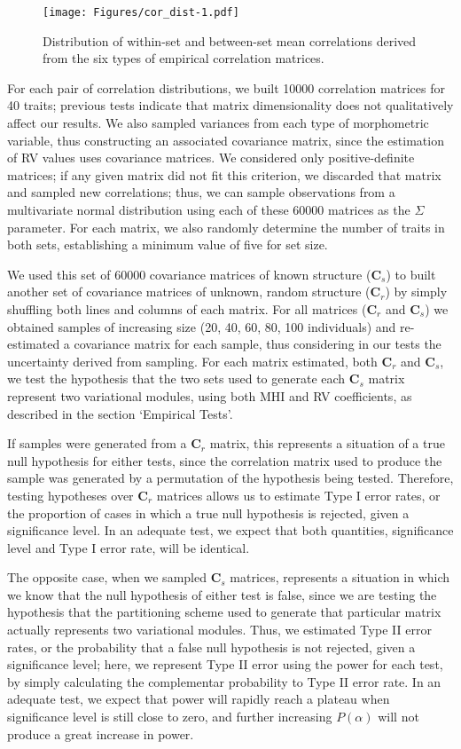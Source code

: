 \documentclass[12pt,twoside]{report}
\begin{document}
\begin{figure}[htbp]
\centering
\texttt{[image: Figures/cor\_dist-1.pdf]}
\caption{Distribution of within-set and between-set mean correlations
derived from the six types of empirical correlation matrices.
\label{fig:cor_dist}}
\end{figure}

For each pair of correlation distributions, we built 10000 correlation
matrices for 40 traits; previous tests indicate that matrix
dimensionality does not qualitatively affect our results. We also
sampled variances from each type of morphometric variable, thus
constructing an associated covariance matrix, since the estimation of RV
values uses covariance matrices. We considered only positive-definite
matrices; if any given matrix did not fit this criterion, we discarded
that matrix and sampled new correlations; thus, we can sample
observations from a multivariate normal distribution using each of these
60000 matrices as the $\Sigma$ parameter. For each matrix, we also
randomly determine the number of traits in both sets, establishing a
minimum value of five for set size.

We used this set of 60000 covariance matrices of known structure
($\mathbf{C}_s$) to built another set of covariance matrices of unknown,
random structure ($\mathbf{C}_r$) by simply shuffling both lines and
columns of each matrix. For all matrices ($\mathbf{C}_r$ and
$\mathbf{C}_s$) we obtained samples of increasing size (20, 40, 60, 80,
100 individuals) and re-estimated a covariance matrix for each sample,
thus considering in our tests the uncertainty derived from sampling. For
each matrix estimated, both $\mathbf{C}_r$ and $\mathbf{C}_s$, we test
the hypothesis that the two sets used to generate each $\mathbf{C}_s$
matrix represent two variational modules, using both MHI and RV
coefficients, as described in the section `Empirical Tests'.

If samples were generated from a $\mathbf{C}_r$ matrix, this represents
a situation of a true null hypothesis for either tests, since the
correlation matrix used to produce the sample was generated by a
permutation of the hypothesis being tested. Therefore, testing
hypotheses over $\mathbf{C}_r$ matrices allows us to estimate Type I
error rates, or the proportion of cases in which a true null hypothesis
is rejected, given a significance level. In an adequate test, we expect
that both quantities, significance level and Type I error rate, will be
identical.

The opposite case, when we sampled $\mathbf{C}_s$ matrices, represents a
situation in which we know that the null hypothesis of either test is
false, since we are testing the hypothesis that the partitioning scheme
used to generate that particular matrix actually represents two
variational modules. Thus, we estimated Type II error rates, or the
probability that a false null hypothesis is not rejected, given a
significance level; here, we represent Type II error using the power for
each test, by simply calculating the complementar probability to Type II
error rate. In an adequate test, we expect that power will rapidly reach
a plateau when significance level is still close to zero, and further
increasing $P(\alpha)$ will not produce a great increase in power.
\end{document}
